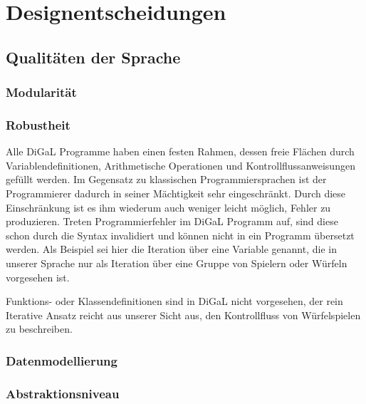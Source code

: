 
\chapter{Designentscheidungen}
\label{cha:designentscheidungen}

\section{Qualitäten der Sprache} %
\label{sec:qualitaten_der_sprache}


\subsection{Modularität} %
\label{sub:modularitat}


\subsection{Robustheit} %
\label{sub:robustheit}
Alle DiGaL Programme haben einen festen Rahmen, dessen freie Flächen durch Variablendefinitionen, Arithmetische Operationen und Kontrollflussanweisungen gefüllt werden. Im Gegensatz zu klassischen Programmiersprachen ist der Programmierer dadurch in seiner Mächtigkeit sehr eingeschränkt. Durch diese Einschränkung ist es ihm wiederum auch weniger leicht möglich, Fehler zu produzieren. Treten Programmierfehler im DiGaL Programm auf, sind diese schon durch die Syntax invalidiert und können nicht in ein Programm übersetzt werden. Als Beispiel sei hier die Iteration über eine Variable genannt, die in unserer Sprache nur als Iteration über eine Gruppe von Spielern oder Würfeln vorgesehen ist. 

Funktions- oder Klassendefinitionen sind in DiGaL nicht vorgesehen, der rein Iterative Ansatz reicht aus unserer Sicht aus, den Kontrollfluss von Würfelspielen zu beschreiben.

\subsection{Datenmodellierung} %
\label{sub:datenmodellierung}


\subsection{Abstraktionsniveau} %
\label{sub:abstraktionsniveau}

